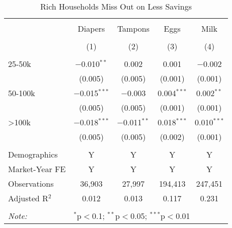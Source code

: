 
\begin{table}[!htbp] \centering 
  \caption{Rich Households Miss Out on Less Savings} 
  \label{tab:lowestPrice} 
\begin{tabular}{@{\extracolsep{5pt}}lcccc} 
\\[-1.8ex]\hline 
\hline \\[-1.8ex] 
 & Diapers & Tampons & Eggs & Milk \\ 
\\[-1.8ex] & (1) & (2) & (3) & (4)\\ 
\hline \\[-1.8ex] 
 25-50k & $-$0.010$^{**}$ & 0.002 & 0.001 & $-$0.002 \\ 
  & (0.005) & (0.005) & (0.001) & (0.001) \\ 
  50-100k & $-$0.015$^{***}$ & $-$0.003 & 0.004$^{***}$ & 0.002$^{**}$ \\ 
  & (0.005) & (0.005) & (0.001) & (0.001) \\ 
  >100k & $-$0.018$^{***}$ & $-$0.011$^{**}$ & 0.018$^{***}$ & 0.010$^{***}$ \\ 
  & (0.005) & (0.005) & (0.002) & (0.001) \\ 
 \hline \\[-1.8ex] 
Demographics & Y & Y & Y & Y \\ 
Market-Year FE & Y & Y & Y & Y \\ 
Observations & 36,903 & 27,997 & 194,413 & 247,451 \\ 
Adjusted R$^{2}$ & 0.012 & 0.013 & 0.117 & 0.231 \\ 
\hline 
\hline \\[-1.8ex] 
\textit{Note:}  & \multicolumn{4}{l}{$^{*}$p$<$0.1; $^{**}$p$<$0.05; $^{***}$p$<$0.01} \\ 
\end{tabular} 
\end{table} 
